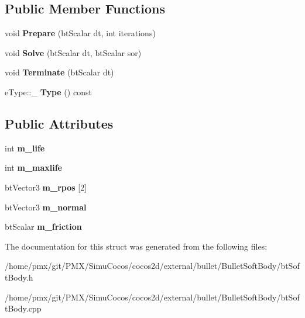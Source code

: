 \subsection*{Public Member Functions}
\begin{DoxyCompactItemize}
\item 
\mbox{\label{structbtSoftBody_1_1CJoint_a632281fa2e040825aea5c0f871a89587}} 
void {\bfseries Prepare} (bt\+Scalar dt, int iterations)
\item 
\mbox{\label{structbtSoftBody_1_1CJoint_aea04c88d0da5c5dbecc545a06af7b97a}} 
void {\bfseries Solve} (bt\+Scalar dt, bt\+Scalar sor)
\item 
\mbox{\label{structbtSoftBody_1_1CJoint_a12ae7ef7a49dc7c32c104bcb170d54d5}} 
void {\bfseries Terminate} (bt\+Scalar dt)
\item 
\mbox{\label{structbtSoftBody_1_1CJoint_a4e8cfb933d5b9a0fa88e5dfdaf2186b4}} 
e\+Type\+::\+\_\+ {\bfseries Type} () const
\end{DoxyCompactItemize}
\subsection*{Public Attributes}
\begin{DoxyCompactItemize}
\item 
\mbox{\label{structbtSoftBody_1_1CJoint_a49591228100e08973a61835c290b707b}} 
int {\bfseries m\+\_\+life}
\item 
\mbox{\label{structbtSoftBody_1_1CJoint_ab796ab500e1b67afc274a65bbeed100e}} 
int {\bfseries m\+\_\+maxlife}
\item 
\mbox{\label{structbtSoftBody_1_1CJoint_a5ef822996ef5db8f8cf768b1ade8c1aa}} 
bt\+Vector3 {\bfseries m\+\_\+rpos} \mbox{[}2\mbox{]}
\item 
\mbox{\label{structbtSoftBody_1_1CJoint_a862813f43cdb37c9200bfb213d78d626}} 
bt\+Vector3 {\bfseries m\+\_\+normal}
\item 
\mbox{\label{structbtSoftBody_1_1CJoint_ac27120e3c608f2f478a9ea3cffc03656}} 
bt\+Scalar {\bfseries m\+\_\+friction}
\end{DoxyCompactItemize}


The documentation for this struct was generated from the following files\+:\begin{DoxyCompactItemize}
\item 
/home/pmx/git/\+P\+M\+X/\+Simu\+Cocos/cocos2d/external/bullet/\+Bullet\+Soft\+Body/bt\+Soft\+Body.\+h\item 
/home/pmx/git/\+P\+M\+X/\+Simu\+Cocos/cocos2d/external/bullet/\+Bullet\+Soft\+Body/bt\+Soft\+Body.\+cpp\end{DoxyCompactItemize}
